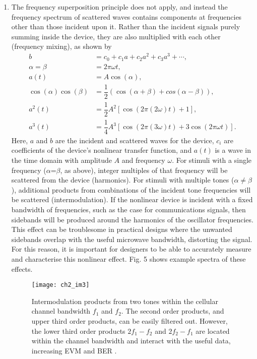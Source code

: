 \documentclass[../thesis.tex]{subfiles}
\begin{document}
\begin{refsection}
\begin{enumerate}
\item The frequency superposition principle does not apply, and instead the frequency spectrum of scattered waves contains components at frequencies other than those incident upon it. Rather than the incident signals purely summing inside the device, they are also multiplied with each other (frequency mixing), as shown by
\begin{align}
b&=c_0+c_1a+c_2a^2+c_3a^3+\cdots,\\
\alpha=\beta&=2\pi\omega t,\\
a(t)&=A\cos(\alpha),\\
\cos(\alpha)\cos(\beta)&=\dfrac{1}{2}(\cos(\alpha+\beta)+cos(\alpha-\beta)),\\
a^2(t)&=\dfrac{1}{2}A^2[\cos(2\pi(2\omega)t)+1],\\
a^3(t)&=\dfrac{1}{4}A^3[\cos(2\pi(3\omega)t)+3\cos(2\pi\omega t)].
\end{align}
Here, $a$ and $b$ are the incident and scattered waves for the device, $c_i$ are coefficients of the device's nonlinear transfer function, and $a(t)$ is a wave in the time domain with amplitude $A$ and frequency $\omega$. For stimuli with a single frequency ($\alpha$=$\beta$, as above), integer multiples of that frequency will be scattered from the device (harmonics). For stimuli with multiple tones ($\alpha\ne\beta$), additional products from combinations of the incident tone frequencies will be scattered (intermodulation). If the nonlinear device is incident with a fixed bandwidth of frequencies, such as the case for communications signals, then sidebands will be produced around the harmonics of the oscillator frequencies. This effect can be troublesome in practical designs where the unwanted sidebands overlap with the useful microwave bandwidth, distorting the signal. For this reason, it is important for designers to be able to accurately measure and characterise this nonlinear effect. Fig. 5 shows example spectra of these effects.

\begin{figure}
	\centering
	\texttt{[image: ch2\_im3]}
	\caption{Intermodulation products from two tones within the cellular channel bandwidth $f_1$ and $f_2$. The second order products, and upper third order products, can be easily filtered out. However, the lower third order products $2f_1-f_2$ and $2f_2-f_1$ are located within the channel bandwidth and interact with the useful data, increasing EVM and BER \cite{Hall2013}.}
	\label{ch2_im3}
\end{figure}


\end{enumerate}
\end{refsection}
\end{document}
